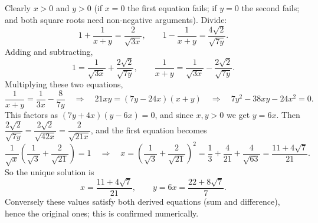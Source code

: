 Clearly $x>0$ and $y>0$ (if $x=0$ the first equation fails; if $y=0$ the second fails; and both square roots need non-negative arguments). Divide:
\[
1+\dfrac{1}{x+y}=\dfrac{2}{\sqrt{3x}},\qquad 1-\dfrac{1}{x+y}=\dfrac{4\sqrt2}{\sqrt{7y}} .
\]
Adding and subtracting,
\[
1=\dfrac{1}{\sqrt{3x}}+\dfrac{2\sqrt2}{\sqrt{7y}},\qquad \dfrac{1}{x+y}=\dfrac{1}{\sqrt{3x}}-\dfrac{2\sqrt2}{\sqrt{7y}} .
\]
Multiplying these two equations,
\[
\dfrac{1}{x+y}=\dfrac{1}{3x}-\dfrac{8}{7y}\quad\Longrightarrow\quad 21xy=(7y-24x)(x+y)\quad\Longrightarrow\quad 7y^2-38xy-24x^2=0 .
\]
This factors as $(7y+4x)(y-6x)=0$, and since $x,y>0$ we get $y=6x$. Then $\dfrac{2\sqrt2}{\sqrt{7y}}=\dfrac{2\sqrt2}{\sqrt{42x}}=\dfrac{2}{\sqrt{21x}}$, and the first equation becomes
\[
\dfrac{1}{\sqrt x}\left(\dfrac{1}{\sqrt3}+\dfrac{2}{\sqrt{21}}\right)=1\quad\Longrightarrow\quad x=\left(\dfrac{1}{\sqrt3}+\dfrac{2}{\sqrt{21}}\right)^2=\dfrac{1}{3}+\dfrac{4}{21}+\dfrac{4}{\sqrt{63}}=\dfrac{11+4\sqrt7}{21}.
\]
So the unique solution is
\[
\boxed{x=\dfrac{11+4\sqrt7}{21},\qquad y=6x=\dfrac{22+8\sqrt7}{7}} .
\]
Conversely these values satisfy both derived equations (sum and difference), hence the original ones; this is confirmed numerically.
